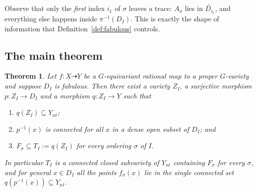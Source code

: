 \documentclass[11pt]{amsart}
\theoremstyle{plain}
\newtheorem{theorem}{Theorem}[section]
\theoremstyle{definition}
\theoremstyle{remark}
\numberwithin{equation}{section}
\begin{document}
Observe that only the \emph{first} index $i_1$ of $\sigma$ leaves a trace:
$A_\sigma$ lies in $\widetilde{D_{i_1}}$, and everything else happens inside
$\pi^{-1}(D_I)$.  This is exactly the shape of information that
Definition~\ref{def:fabulous} controls.

\subsection*{The main theorem}

\begin{theorem} \label{thm:fabulous}
Let $f : X \dasharrow Y$ be a $G$-equivariant rational map to a proper
$G$-variety and suppose $D_I$ is fabulous.  Then there exist a variety
$Z_I$, a surjective morphism $p : Z_I \to D_I$ and a morphism
$q : Z_I \to Y$ such that
\begin{enumerate}
\item $q(Z_I) \subseteq Y_{nt}$;
\item $p^{-1}(x)$ is connected for all $x$ in a dense open subset of
$D_I$; and
\item $F_\sigma \subseteq T_I := q(Z_I)$ for every ordering $\sigma$ of
$I$.
\end{enumerate}
In particular $T_I$ is a connected closed subvariety of $Y_{nt}$
containing $F_\sigma$ for every $\sigma$, and for general $x \in D_I$ all
the points $f_\sigma(x)$ lie in the single connected set
$q(p^{-1}(x)) \subseteq Y_{nt}$.
\end{theorem}
\end{document}
